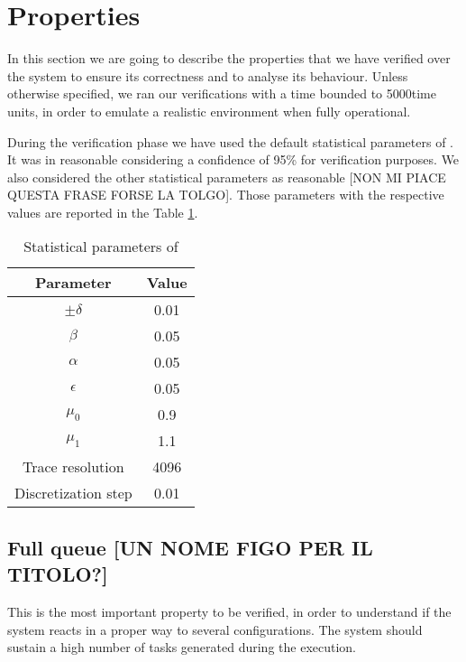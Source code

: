 \newcommand{\tauconst}{5000}
\newcommand{\query}{[INSERIRE LA QUERY CON NOTAZIONE CTL]}
\newcommand{\mT}{\ensuremath{\mu_T}}
\newcommand{\vT}{\ensuremath{\sigma_T}}
\newcommand{\mH}{\ensuremath{\mu_H}}
\newcommand{\vH}{\ensuremath{\sigma_H}}
\newcommand{\K}{\ensuremath{K}}
\newcommand{\expdel}{\ensuremath{\lambda}}

\section{Properties}
In this section we are going to describe the properties that we have verified over the system to ensure its correctness and to analyse its behaviour. Unless otherwise specified, we ran our verifications with a time bounded to \tauconst \space time units, in order to emulate a realistic environment when fully operational.

During the verification phase we have used the default statistical parameters of \UPPAAL. It was in reasonable considering a confidence of 95\% for verification purposes. We also considered the other statistical parameters as reasonable [NON MI PIACE QUESTA FRASE FORSE LA TOLGO]. Those parameters with the respective values are reported in the Table \ref{tab:statparam}.

\begin{table}[h]
    \centering
        \begin{tabular}{|c c|} 
            \hline
            Parameter & Value \\ [0.5ex] 
            \hline\hline
            $\pm\delta$ & 0.01 \\
            $\beta$ & 0.05 \\
            $\alpha$ & 0.05 \\
            $\epsilon$ & 0.05 \\
            $\mu_0$ & 0.9 \\
            $\mu_1$ & 1.1 \\
            Trace resolution & 4096 \\
            Discretization step & 0.01 \\ [0.5ex] 
            \hline
        \end{tabular}
        \caption{Statistical parameters of \UPPAAL}
        \label{tab:statparam}
\end{table}

\subsection{Full queue [UN NOME FIGO PER IL TITOLO?]}
This is the most important property to be verified, in order to understand if the system reacts in a proper way to several configurations. The system should sustain a high number of tasks generated during the execution.

